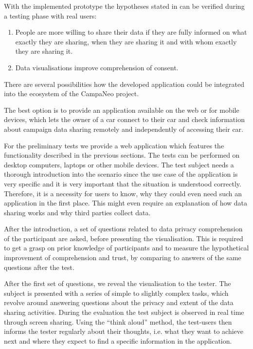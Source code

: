 \documentclass[../paper.tex]{subfiles}
\begin{document}
  With the implemented prototype the hypotheses stated in  can be verified during a
  testing phase with real users:
  \begin{enumerate}
    \item People are more willing to share their data if they are fully informed
          on what exactly they are sharing, when they are sharing it and with
          whom exactly they are sharing it.
    \item Data visualisations improve comprehension of consent.
  \end{enumerate}
  There are several possibilities how the developed application could be
  integrated into the ecosystem of the CampaNeo project.

  The best option is to provide an application available
  on the web or for mobile devices, which lets the owner of a car connect to
  their car and check information about campaign data sharing remotely and
  independently of accessing their car.

  For the preliminary tests we provide a web application which features the functionality described in the
  previous sections. The tests can be performed on desktop computers, laptops
  or other mobile devices. The test subject needs a thorough introduction
  into the scenario since the use case of the application is very specific and
  it is very important that the situation is understood correctly. Therefore,
  it is a necessity for users to know, why they could even need such an application
  in the first place. This might even require an explanation of how data sharing
  works and why third parties collect data.

  After the introduction, a set of questions related to data privacy comprehension
  of the participant are asked, before presenting the visualisation. This is
  required to get a grasp on prior knowledge of participants and to measure the
  hypothetical improvement of comprehension and trust, by comparing to answers of
  the same questions after the test.

  After the first set of questions, we reveal the visualisation to the tester. The subject is presented with
  a series of simple to slightly complex tasks, which revolve around answering
  questions about the privacy and extent of the data sharing activities.
  During the evaluation the test subject is observed in real time
  through screen sharing. Using the “think aloud” method, the test-users then
  informs the tester regularly about their thoughts, i.e. what
  they want to achieve next and where they expect to find a specific information
  in the application. 
\end{document}
